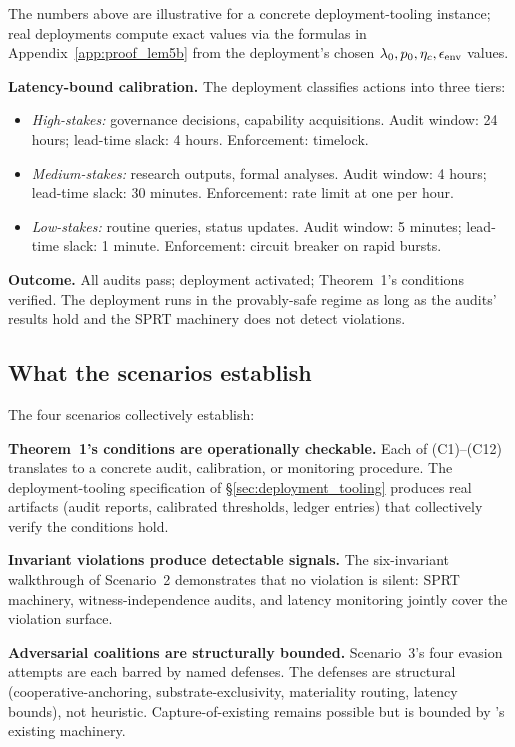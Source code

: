The numbers above are illustrative for a concrete deployment-tooling instance;
real deployments compute exact values via the formulas in
Appendix~\ref{app:proof_lem5b} from the deployment's chosen $\lambda_0, p_0,
\eta_c, \epsilon_{\mathrm{env}}$ values.

\textbf{Latency-bound calibration.}  The deployment classifies
actions into three tiers:
\begin{itemize}
\item \emph{High-stakes:} governance decisions, capability
  acquisitions. Audit window: 24 hours; lead-time slack: 4 hours.
  Enforcement: timelock.
\item \emph{Medium-stakes:} research outputs, formal analyses.
  Audit window: 4 hours; lead-time slack: 30 minutes. Enforcement:
  rate limit at one per hour.
\item \emph{Low-stakes:} routine queries, status updates. Audit
  window: 5 minutes; lead-time slack: 1 minute. Enforcement: circuit
  breaker on rapid bursts.
\end{itemize}

\textbf{Outcome.}  All audits pass; deployment activated;
Theorem~1's conditions verified. The deployment runs in the
provably-safe regime as long as the audits' results hold and the
SPRT machinery does not detect violations.

\subsection{What the scenarios establish}
\label{sec:scenarios_establish}

The four scenarios collectively establish:

\textbf{Theorem~1's conditions are operationally checkable.}  Each
of (C1)--(C12) translates to a concrete audit, calibration, or
monitoring procedure. The deployment-tooling specification of
\S\ref{sec:deployment_tooling} produces real artifacts (audit
reports, calibrated thresholds, ledger entries) that collectively
verify the conditions hold.

\textbf{Invariant violations produce detectable signals.}  The
six-invariant walkthrough of Scenario~2 demonstrates that no
violation is silent: SPRT machinery, witness-independence audits,
and latency monitoring jointly cover the violation surface.

\textbf{Adversarial coalitions are structurally bounded.}
Scenario~3's four evasion attempts are each barred by named
defenses. The defenses are structural (cooperative-anchoring,
substrate-exclusivity, materiality routing, latency bounds), not
heuristic. Capture-of-existing remains possible but is bounded by
\citep[Exogenous~Verification]{lasser2026exo}'s existing machinery.

